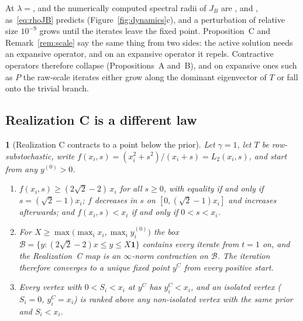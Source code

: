 \documentclass[11pt,a4paper]{article}
\theoremstyle{definition}
\theoremstyle{plain}
\newcommand{\genpropname}{}
\newtheorem*{genprop}{\genpropname}
\newenvironment{prop}[1]{\renewcommand{\genpropname}{Proposition #1}\begin{genprop}}{\end{genprop}}
\newcommand{\one}{\mathbf{1}}
\begin{document}
At $\lambda={}$\LamValOne{}, \LamValTwo{} and \LamValThree{} the numerically computed spectral radii of $J_B$ are \RhoJBOne, \RhoJBTwo{} and \RhoJBThree, as~\eqref{eq:rhoJB} predicts (Figure~\ref{fig:dynamics}c), and a perturbation of relative size $10^{-9}$ grows until the iterates leave the fixed point. Proposition~C and Remark~\ref{rem:scale} say the same thing from two sides: the active solution needs an expansive operator, and on an expansive operator it repels. Contractive operators therefore collapse (Propositions~A and~B), and on expansive ones such as $P$ the raw-scale iterates either grow along the dominant eigenvector of $T$ or fall onto the trivial branch.

\subsection{Realization C is a different law}

\begin{prop}{D}[Realization C contracts to a point below the prior]
Let $\gamma=1$, let $T$ be row-substochastic, write $f(x_i,s)=(x_i^2+s^2)/(x_i+s)=L_2(x_i,s)$, and start from any $y^{(0)}>0$.
\begin{enumerate}[label=(\roman*),leftmargin=2em]
\item $f(x_i,s)\ge(2\sqrt2-2)\,x_i$ for all $s\ge0$, with equality if and only if $s=(\sqrt2-1)x_i$; $f$ decreases in $s$ on $[0,(\sqrt2-1)x_i]$ and increases afterwards; and $f(x_i,s)<x_i$ if and only if $0<s<x_i$.
\item For $X\ge\max\big(\max_ix_i,\max_iy^{(0)}_i\big)$ the box $\mathcal B=\{y:(2\sqrt2-2)x\le y\le X\one\}$ contains every iterate from $t=1$ on, and the Realization~C map is an $\infty$-norm contraction on $\mathcal B$. The iteration therefore converges to a unique fixed point $y^C$ from every positive start.
\item Every vertex with $0<S_i<x_i$ at $y^C$ has $y^C_i<x_i$, and an isolated vertex ($S_i=0$, $y^C_i=x_i$) is ranked above any non-isolated vertex with the same prior and $S_i<x_i$.
\end{enumerate}
\end{prop}
\end{document}

